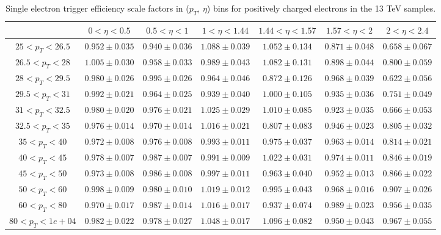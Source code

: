 \begin{table}
\begin{center}
{\begin{tabular}{ccccccc}
\hline
& $0< \eta<0.5$ & $0.5< \eta<1$ & $1< \eta<1.44$ & $1.44< \eta<1.57$ & $1.57< \eta<2$ & $2< \eta<2.4$ \\
\hline \hline
$25<p_{T}<26.5$ & $0.952 \pm 0.035$ & $0.940 \pm 0.036$ & $1.088 \pm 0.039$ & $1.052 \pm 0.134$ & $0.871 \pm 0.048$ & $0.658 \pm 0.067$  \\
$26.5<p_{T}<28$ & $1.005 \pm 0.030$ & $0.958 \pm 0.033$ & $0.989 \pm 0.043$ & $1.082 \pm 0.131$ & $0.898 \pm 0.044$ & $0.800 \pm 0.059$  \\
$28<p_{T}<29.5$ & $0.980 \pm 0.026$ & $0.995 \pm 0.026$ & $0.964 \pm 0.046$ & $0.872 \pm 0.126$ & $0.968 \pm 0.039$ & $0.622 \pm 0.056$  \\
$29.5<p_{T}<31$ & $0.992 \pm 0.021$ & $0.964 \pm 0.025$ & $0.939 \pm 0.040$ & $1.000 \pm 0.105$ & $0.935 \pm 0.036$ & $0.751 \pm 0.049$  \\
$31<p_{T}<32.5$ & $0.980 \pm 0.020$ & $0.976 \pm 0.021$ & $1.025 \pm 0.029$ & $1.010 \pm 0.085$ & $0.923 \pm 0.035$ & $0.666 \pm 0.053$  \\
$32.5<p_{T}<35$ & $0.976 \pm 0.014$ & $0.970 \pm 0.014$ & $1.016 \pm 0.021$ & $0.807 \pm 0.083$ & $0.946 \pm 0.023$ & $0.805 \pm 0.032$  \\
$35<p_{T}<40$ & $0.972 \pm 0.008$ & $0.976 \pm 0.008$ & $0.993 \pm 0.011$ & $0.975 \pm 0.037$ & $0.963 \pm 0.014$ & $0.814 \pm 0.021$  \\
$40<p_{T}<45$ & $0.978 \pm 0.007$ & $0.987 \pm 0.007$ & $0.991 \pm 0.009$ & $1.022 \pm 0.031$ & $0.974 \pm 0.011$ & $0.846 \pm 0.019$  \\
$45<p_{T}<50$ & $0.973 \pm 0.008$ & $0.986 \pm 0.008$ & $0.997 \pm 0.011$ & $0.963 \pm 0.040$ & $0.952 \pm 0.013$ & $0.866 \pm 0.022$  \\
$50<p_{T}<60$ & $0.998 \pm 0.009$ & $0.980 \pm 0.010$ & $1.019 \pm 0.012$ & $0.995 \pm 0.043$ & $0.968 \pm 0.016$ & $0.907 \pm 0.026$  \\
$60<p_{T}<80$ & $0.970 \pm 0.017$ & $0.987 \pm 0.014$ & $1.016 \pm 0.017$ & $0.937 \pm 0.074$ & $0.989 \pm 0.023$ & $0.956 \pm 0.035$  \\
$80<p_{T}<1e+04$ & $0.982 \pm 0.022$ & $0.978 \pm 0.027$ & $1.048 \pm 0.017$ & $1.096 \pm 0.082$ & $0.950 \pm 0.043$ & $0.967 \pm 0.055$  \\
\hline
\end{tabular}}
\end{center}
\caption{Single electron trigger efficiency scale factors in ($p_T$, $\eta$) bins for positively charged electrons in the 13 TeV samples.}
\label{tab:Eff:el:13TeV:HLT:pos}
\end{table}
